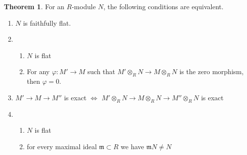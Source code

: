 \documentclass[a4paper]{book}
\theoremstyle{definition}
\newtheorem{theorem}[definition]{Theorem}
\begin{document}
\begin{thmbox}
    \begin{theorem}
        For an \(R\)-module \(N\), the following conditions are equivalent.
        \begin{enumerate}
            \item \(N\) is faithfully flat.
            \item \begin{enumerate}
                \item \(N\) is flat
                \item For any \(\varphi: M' \longrightarrow M\) such that \(M' \otimes_R N \longrightarrow M \otimes_R N\) is the zero morphism, then \(\varphi = 0\).
            \end{enumerate}
            \item \(M' \rightarrow M \rightarrow M''\) is exact \(\iff\) \(M' \otimes_R N \rightarrow M \otimes_R N \rightarrow M'' \otimes_R N\) is exact
            \item \begin{enumerate}
                \item \(N\) is flat
                \item for every maximal ideal \(\mathfrak{m} \subset R\) we have \(\mathfrak{m}N \neq N\)
            \end{enumerate}
        \end{enumerate}
    \end{theorem}
\end{thmbox}
\end{document}
